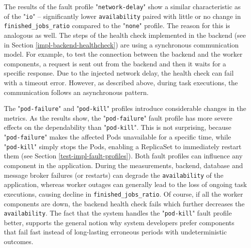 The results of the fault profile "\texttt{network-delay}" show a similar characteristic as of the "\texttt{io}" -- significantly lower \texttt{availability} paired with little or no change in \texttt{finished\_jobs\_ratio} compared to the "\texttt{none}" profile. The reason for this is analogous as well. The steps of the health check implemented in the backend (see in Section \ref{impl-backend-healthcheck}) are using a synchronous communication model. For example, to test the connection between the backend and the worker components, a request is sent out from the backend and then it waits for a specific response. Due to the injected network delay, the health check can fail with a timeout error. However, as described above, during task executions, the communication follows an asynchronous pattern.

The "\texttt{pod-failure}" and "\texttt{pod-kill}" profiles introduce considerable changes in the metrics. As the results show, the "\texttt{pod-failure}" fault profile has more severe effects on the dependability than "\texttt{pod-kill}". This is not surprising, because "\texttt{pod-failure}" makes the affected Pods unavailable for a specific time, while "\texttt{pod-kill}" simply stops the Pods, enabling a ReplicaSet to immediately restart them (see Section \ref{test-impl-fault-profiles}). Both fault profiles can influence any component in the application. During the measurements, backend, database and message broker failures (or restarts) can degrade the \texttt{availability} of the application, whereas worker outages can generally lead to the loss of ongoing task executions, causing decline in \texttt{finished\_jobs\_ratio}. Of course, if all the worker components are down, the backend health check fails which further decreases the \texttt{availability}. The fact that the system handles the "\texttt{pod-kill}" fault profile better, supports the general notion why system developers prefer components that fail fast instead of long-lasting erroneous periods with undeterministic outcomes.


